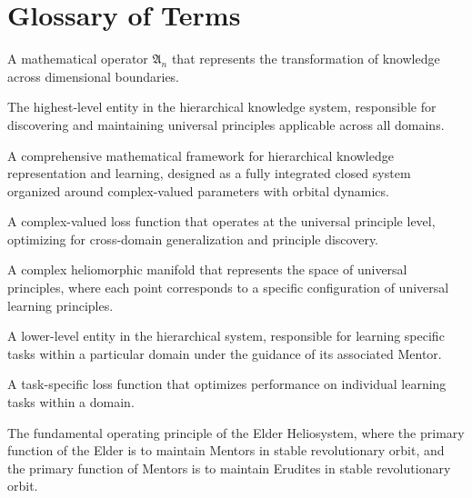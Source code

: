 \chapter*{Glossary of Terms}

\begin{description}[leftmargin=2cm, style=nextline]
    \item[Arcane] A mathematical operator $\mathfrak{A}_{n}$ that represents the transformation of knowledge across dimensional boundaries.
    
    \item[Elder] The highest-level entity in the hierarchical knowledge system, responsible for discovering and maintaining universal principles applicable across all domains.
    
    \item[Elder Heliosystem] A comprehensive mathematical framework for hierarchical knowledge representation and learning, designed as a fully integrated closed system organized around complex-valued parameters with orbital dynamics.
    
    \item[Elder Loss] A complex-valued loss function that operates at the universal principle level, optimizing for cross-domain generalization and principle discovery.
    
    \item[Elder Manifold] A complex heliomorphic manifold that represents the space of universal principles, where each point corresponds to a specific configuration of universal learning principles.
    
    \item[Erudite] A lower-level entity in the hierarchical system, responsible for learning specific tasks within a particular domain under the guidance of its associated Mentor.
    
    \item[Erudite Loss] A task-specific loss function that optimizes performance on individual learning tasks within a domain.
    
    \item[Gravitational Stability] The fundamental operating principle of the Elder Heliosystem, where the primary function of the Elder is to maintain Mentors in stable revolutionary orbit, and the primary function of Mentors is to maintain Erudites in stable revolutionary orbit.
    

\end{description}
